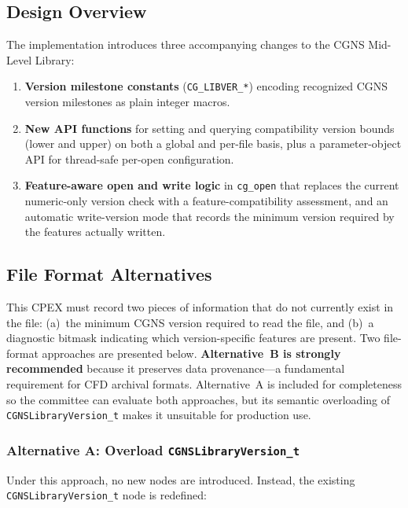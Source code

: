 \documentclass[11pt,letterpaper]{article}
\begin{document}
\subsection{Design Overview}

The implementation introduces three accompanying changes to the CGNS
Mid-Level Library:

\begin{enumerate}[leftmargin=2em]
\item \textbf{Version milestone constants} (\texttt{CG\_LIBVER\_*})
  encoding recognized CGNS version milestones as plain integer macros.
\item \textbf{New API functions} for setting and querying
  compatibility version bounds (lower and upper) on both a global and
  per-file basis, plus a parameter-object API for thread-safe per-open
  configuration.
\item \textbf{Feature-aware open and write logic} in \texttt{cg\_open}
  that replaces the current numeric-only version check with a
  feature-compatibility assessment, and an automatic write-version
  mode that records the minimum version required by the features
  actually written.
\end{enumerate}

\subsection{File Format Alternatives}
\label{sec:file-format-alts}
\label{sec:format-alternatives}

This CPEX must record two pieces of information that do not currently
exist in the file: (a)~the minimum CGNS version required to read the
file, and (b)~a diagnostic bitmask indicating which version-specific
features are present.  Two file-format approaches are presented below.
\textbf{Alternative~B is strongly recommended} because it preserves
data provenance---a fundamental requirement for CFD archival
formats.  Alternative~A is included for completeness so the committee
can evaluate both approaches, but its semantic overloading of
\texttt{CGNSLibraryVersion\_t} makes it unsuitable for production use.

\subsubsection{Alternative A: Overload \texttt{CGNSLibraryVersion\_t}}

Under this approach, no new nodes are introduced.  Instead, the
existing \texttt{CGNSLibraryVersion\_t} node is redefined:
\end{document}
